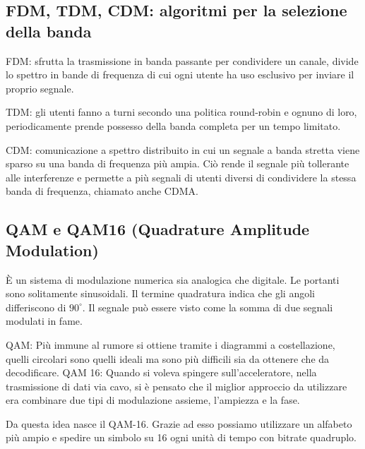 \subsection{FDM, TDM, CDM: algoritmi per la selezione della banda}

FDM: sfrutta la trasmissione in banda passante per condividere un canale, divide lo spettro in
bande di frequenza di cui ogni utente ha uso esclusivo per inviare il proprio segnale.

TDM: gli utenti fanno a turni secondo una politica round-robin e ognuno di loro, periodicamente
prende possesso della banda completa per un tempo limitato.

CDM: comunicazione a spettro distribuito in cui un segnale a banda stretta viene sparso su una
banda di frequenza più ampia. Ciò rende il segnale più tollerante alle interferenze e permette a più
segnali di utenti diversi di condividere la stessa banda di frequenza, chiamato anche CDMA.

\subsection{QAM e QAM16 (Quadrature Amplitude Modulation)}

È un sistema di modulazione numerica sia analogica che digitale. Le portanti sono solitamente
sinusoidali. Il termine quadratura indica che gli angoli differiscono di $90 ^{\circ}$. Il segnale può essere visto
come la somma di due segnali modulati in fame.

QAM: Più immune al rumore si ottiene tramite i diagrammi a costellazione, quelli circolari sono
quelli ideali ma sono più difficili sia da ottenere che da decodificare.
QAM 16: Quando si voleva spingere sull’acceleratore, nella trasmissione di dati via cavo, si è
pensato che il miglior approccio da utilizzare era combinare due tipi di modulazione assieme,
l’ampiezza e la fase.

Da questa idea nasce il QAM-16. Grazie ad esso possiamo utilizzare un alfabeto più ampio e spedire
un simbolo su 16 ogni unità di tempo con bitrate quadruplo.